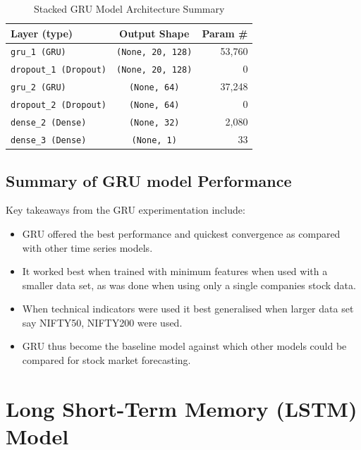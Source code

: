 \begin{table}[h]
    \centering
    \begin{tabular}{|l|c|r|}
        \hline
        \textbf{Layer (type)} & \textbf{Output Shape} & \textbf{Param \#} \\
        \hline
        \hline
        \texttt{gru\_1 (GRU)} & \texttt{(None, 20, 128)} & 53,760 \\
        \hline
        \texttt{dropout\_1 (Dropout)} & \texttt{(None, 20, 128)} & 0 \\
        \hline
        \texttt{gru\_2 (GRU)} & \texttt{(None, 64)} & 37,248 \\
        \hline
        \texttt{dropout\_2 (Dropout)} & \texttt{(None, 64)} & 0 \\
        \hline
        \texttt{dense\_2 (Dense)} & \texttt{(None, 32)} & 2,080 \\
        \hline
        \texttt{dense\_3 (Dense)} & \texttt{(None, 1)} & 33 \\
        \hline
    \end{tabular}
    \caption{Stacked GRU Model Architecture Summary}
    \label{tab:stacked_gru_summary}
\end{table}

\FloatBarrier

\subsection{Summary of GRU model Performance}

Key takeaways from the GRU experimentation include:

\begin{itemize}
    \item GRU offered the best performance and quickest convergence as compared with other time series models.
    \item It worked best when trained with minimum features when used with a smaller data set, as was done when using only a single companies stock data.
    \item When technical indicators were used it best generalised when larger data set say NIFTY50, NIFTY200 were used.
    \item GRU thus become the baseline model against which other models could be compared for stock market forecasting.
\end{itemize}

\clearpage
\FloatBarrier
\section{Long Short-Term Memory (LSTM) Model}

